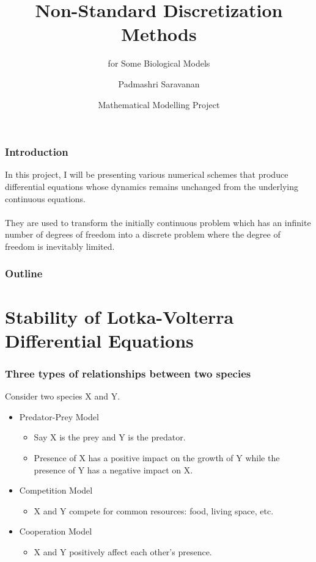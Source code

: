 \documentclass[xcolor={svgnames},hyperref={colorlinks,allcolors=Blue}]{beamer}
\title {Non-Standard Discretization Methods}
\subtitle {for Some Biological Models}
\author{Padmashri Saravanan}
\institute{2018B4PS1039G}
\date[10th April 2021] %
{Mathematical Modelling Project}
\begin{document}

\frame{\titlepage}

\begin{frame}
\frametitle{Introduction}
In this project, I will be presenting various numerical schemes that produce differential equations whose dynamics remains unchanged from the underlying continuous equations.\\~\\ They are used to transform the initially continuous problem which has an infinite number of degrees of freedom into a discrete problem where the degree of freedom is inevitably limited.
\end{frame}

\begin{frame}
    \frametitle{Outline}
    \tableofcontents
 \end{frame}


\section{Stability of Lotka-Volterra Differential Equations}


\begin{frame}
\frametitle{Three types of relationships between two species}
Consider two species X and Y. 
\begin{itemize}
\pause
\item Predator-Prey Model
\begin{itemize}
\item Say X is the prey and Y is the predator.
\pause
\item Presence of X has a positive impact on the growth of Y while the presence of Y has a negative impact on X. 
\end{itemize}

\pause
\item Competition Model
\begin{itemize}
\item X and Y compete for common resources: food, living space, etc.
\end{itemize}

\pause
\item Cooperation Model
\begin{itemize}
\item X and Y positively affect each other's presence. 
\end{itemize}

\end{itemize}
\end{frame}
\end{document}
